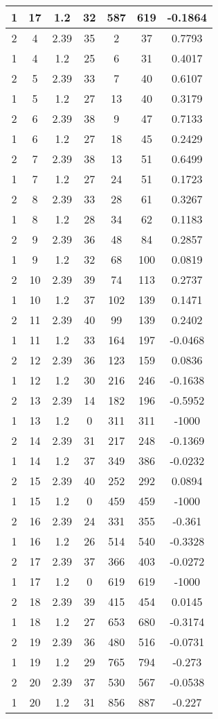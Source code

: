 \documentclass[letterpaper, 12pt]{article}
\begin{document}
\begin{longtable}{|c|c|c|c|c|c|c|}
\hline
1 & 17 & 1.2 & 32 & 587 & 619 & -0.1864 \\
\hline
2 & 4 & 2.39 & 35 & 2 & 37 & 0.7793 \\
\hline
1 & 4 & 1.2 & 25 & 6 & 31 & 0.4017 \\
\hline
2 & 5 & 2.39 & 33 & 7 & 40 & 0.6107 \\
\hline
1 & 5 & 1.2 & 27 & 13 & 40 & 0.3179 \\
\hline
2 & 6 & 2.39 & 38 & 9 & 47 & 0.7133 \\
\hline
1 & 6 & 1.2 & 27 & 18 & 45 & 0.2429 \\
\hline
2 & 7 & 2.39 & 38 & 13 & 51 & 0.6499 \\
\hline
1 & 7 & 1.2 & 27 & 24 & 51 & 0.1723 \\
\hline
2 & 8 & 2.39 & 33 & 28 & 61 & 0.3267 \\
\hline
1 & 8 & 1.2 & 28 & 34 & 62 & 0.1183 \\
\hline
2 & 9 & 2.39 & 36 & 48 & 84 & 0.2857 \\
\hline
1 & 9 & 1.2 & 32 & 68 & 100 & 0.0819 \\
\hline
2 & 10 & 2.39 & 39 & 74 & 113 & 0.2737 \\
\hline
1 & 10 & 1.2 & 37 & 102 & 139 & 0.1471 \\
\hline
2 & 11 & 2.39 & 40 & 99 & 139 & 0.2402 \\
\hline
1 & 11 & 1.2 & 33 & 164 & 197 & -0.0468 \\
\hline
2 & 12 & 2.39 & 36 & 123 & 159 & 0.0836 \\
\hline
1 & 12 & 1.2 & 30 & 216 & 246 & -0.1638 \\
\hline
2 & 13 & 2.39 & 14 & 182 & 196 & -0.5952 \\
\hline
1 & 13 & 1.2 & 0 & 311 & 311 & -1000 \\
\hline
2 & 14 & 2.39 & 31 & 217 & 248 & -0.1369 \\
\hline
1 & 14 & 1.2 & 37 & 349 & 386 & -0.0232 \\
\hline
2 & 15 & 2.39 & 40 & 252 & 292 & 0.0894 \\
\hline
1 & 15 & 1.2 & 0 & 459 & 459 & -1000 \\
\hline
2 & 16 & 2.39 & 24 & 331 & 355 & -0.361 \\
\hline
1 & 16 & 1.2 & 26 & 514 & 540 & -0.3328 \\
\hline
2 & 17 & 2.39 & 37 & 366 & 403 & -0.0272 \\
\hline
1 & 17 & 1.2 & 0 & 619 & 619 & -1000 \\
\hline
2 & 18 & 2.39 & 39 & 415 & 454 & 0.0145 \\
\hline
1 & 18 & 1.2 & 27 & 653 & 680 & -0.3174 \\
\hline
2 & 19 & 2.39 & 36 & 480 & 516 & -0.0731 \\
\hline
1 & 19 & 1.2 & 29 & 765 & 794 & -0.273 \\
\hline
2 & 20 & 2.39 & 37 & 530 & 567 & -0.0538 \\
\hline
1 & 20 & 1.2 & 31 & 856 & 887 & -0.227 \\
\hline
\end{longtable}
\end{document}
